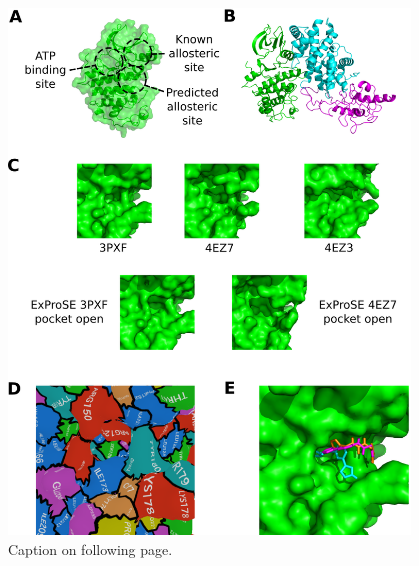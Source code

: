 \begin{figure}
\centering

\includegraphics[width=0.95\textwidth]{figures/cdk2_structure/cdk2_structure}

\caption{Caption on following page.}

\label{fig:cdk2_structure}
\end{figure}

